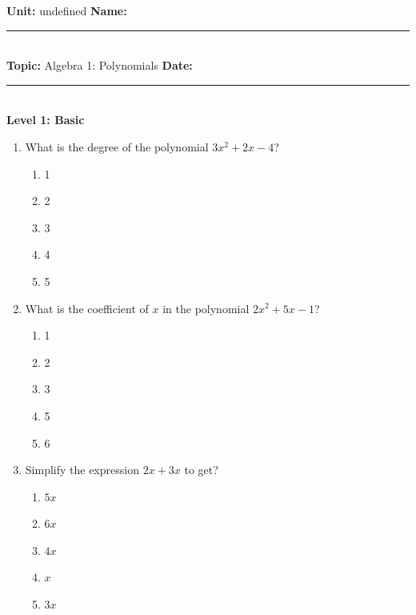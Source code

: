 \documentclass[10pt]{article}
\begin{document}
\enlargethispage{2.5cm}

\begin{tcolorbox}[colback=mainblue!5, colframe=mainblue, sharp corners, boxrule=0.5pt]
    \small \textbf{Unit:} undefined \hfill \textbf{Name:} \rule{3cm}{0.4pt} \\
    \small \textbf{Topic:} Algebra 1: Polynomials \hfill \textbf{Date:} \rule{2cm}{0.4pt} \\
    \centering \textbf{\large Level 1: Basic}
\end{tcolorbox}

\vspace{0.2cm}

\begin{multicols}{2}
\begin{enumerate}[label=\textbf{Q\arabic*.}, leftmargin=*, itemsep=6pt, parsep=0pt]

  \item \small What is the degree of the polynomial $3x^2 + 2x - 4$?
  \begin{enumerate}[label=(\Alph*), leftmargin=0.6cm, nosep, itemsep=2pt]
    \item 1
    \item 2
    \item 3
    \item 4
    \item 5
  \end{enumerate}

  \item \small What is the coefficient of $x$ in the polynomial $2x^2 + 5x - 1$?
  \begin{enumerate}[label=(\Alph*), leftmargin=0.6cm, nosep, itemsep=2pt]
    \item 1
    \item 2
    \item 3
    \item 5
    \item 6
  \end{enumerate}

  \item \small Simplify the expression $2x + 3x$ to get?
  \begin{enumerate}[label=(\Alph*), leftmargin=0.6cm, nosep, itemsep=2pt]
    \item $5x$
    \item $6x$
    \item $4x$
    \item $x$
    \item $3x$
  \end{enumerate}


\end{enumerate}
\end{multicols}
\end{document}
